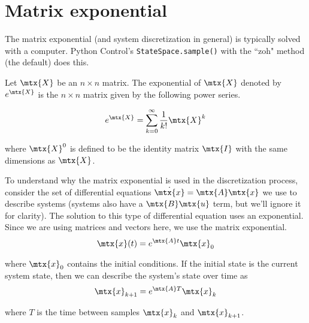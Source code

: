 \section{Matrix exponential}

The matrix exponential (and \gls{system} \gls{discretization} in general) is
typically solved with a computer. Python Control's \texttt{StateSpace.sample()}
with the ``zoh" method (the default) does this.
\begin{definition}
  Let $\mtx{X}$ be an $n \times n$ matrix. The exponential of $\mtx{X}$ denoted
  by $e^{\mtx{X}}$ is the $n \times n$ matrix given by the following power
  series.

  \begin{equation}
    e^{\mtx{X}} = \sum_{k=0}^\infty \frac{1}{k!} \mtx{X}^k \label{eq:mat_exp}
  \end{equation}

  where $\mtx{X}^0$ is defined to be the identity matrix $\mtx{I}$ with the same
  dimensions as $\mtx{X}$.
\end{definition}

To understand why the matrix exponential is used in the \gls{discretization}
process, consider the set of differential equations
$\dot{\mtx{x}} = \mtx{A}\mtx{x}$ we use to describe \glspl{system}
(\glspl{system} also have a $\mtx{B}\mtx{u}$ term, but we'll ignore it for
clarity). The solution to this type of differential equation uses an
exponential. Since we are using matrices and vectors here, we use the matrix
exponential.
\begin{equation*}
  \mtx{x}(t) = e^{\mtx{A}t} \mtx{x}_0
\end{equation*}

where $\mtx{x}_0$ contains the initial conditions. If the initial \gls{state} is
the current system \gls{state}, then we can describe the \gls{system}'s
\gls{state} over time as
\begin{equation*}
  \mtx{x}_{k+1} = e^{\mtx{A}T} \mtx{x}_k
\end{equation*}

where $T$ is the time between samples $\mtx{x}_k$ and $\mtx{x}_{k+1}$.
